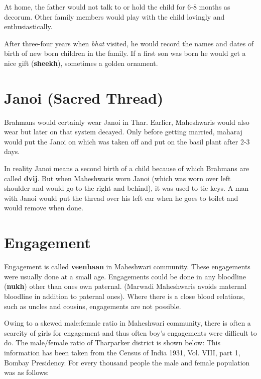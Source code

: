 At home, the father would not talk to or hold the child for 6-8 months as
decorum. Other family members would play with the child lovingly and
enthusiastically.

After three-four years when \textit{bhat} visited, he would record the names
and dates of birth of new born children in the family. If a first son was born
he would get a nice gift (\textbf{sheekh}), sometimes a golden ornament.

\section{Janoi (Sacred Thread)}
Brahmans would certainly wear Janoi in Thar. Earlier, Maheshwaris would also
wear but later on that system decayed. Only before getting married, maharaj
would put the Janoi on which was taken off and put on the basil plant after 2-3
days.

In reality Janoi means a second birth of a child because of which Brahmans are
called \textbf{dvij}. But when Maheshwaris worn Janoi (which was worn over left
shoulder and would go to the right and behind), it was used to tie keys. A man
with Janoi would put the thread over his left ear when he goes to toilet and
would remove when done.

\section{Engagement}
Engagement is called \textbf{veenhaan} in Maheshwari community. These
engagements were usually done at a small age. Engagements could be done in any
bloodline (\textbf{nukh}) other than ones own paternal. (Marwadi Maheshwaris
avoids maternal bloodline in addition to paternal ones). Where there is a close
blood relations, such as uncles and cousins, engagements are not possible.

Owing to a skewed male:female ratio in Maheshwari community, there is often a
scarcity of girls for engagement and thus often boy's engagements were
difficult to do.
The male/female ratio of Tharparker district is shown below: This information
has been taken from the Census of India 1931, Vol. VIII, part 1, Bombay
Presidency. For every thousand people the male and female population was as
follows:

